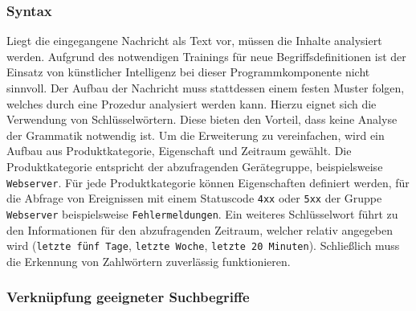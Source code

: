 \subsubsection{Syntax}
\label{sec:syntax}

Liegt die eingegangene Nachricht als Text vor, müssen die Inhalte analysiert werden. Aufgrund des notwendigen Trainings für neue Begriffsdefinitionen ist der Einsatz von künstlicher Intelligenz bei dieser Programmkomponente nicht sinnvoll. Der Aufbau der Nachricht muss stattdessen einem festen Muster folgen, welches durch eine Prozedur analysiert werden kann. Hierzu eignet sich die Verwendung von Schlüsselwörtern. Diese bieten den Vorteil, dass keine Analyse der Grammatik notwendig ist. Um die Erweiterung zu vereinfachen, wird ein Aufbau aus Produktkategorie, Eigenschaft und Zeitraum gewählt. Die Produktkategorie entspricht der abzufragenden Gerätegruppe, beispielsweise \lstinline{Webserver}. Für jede Produktkategorie können Eigenschaften definiert werden, für die Abfrage von Ereignissen mit einem Statuscode \lstinline{4xx} oder \lstinline{5xx} der Gruppe \lstinline{Webserver} beispielsweise \lstinline{Fehlermeldungen}. Ein weiteres Schlüsselwort führt zu den Informationen für den abzufragenden Zeitraum, welcher relativ angegeben wird (\lstinline{letzte fünf Tage}, \lstinline{letzte Woche}, \lstinline{letzte 20 Minuten}). Schließlich muss die Erkennung von Zahlwörtern zuverlässig funktionieren.

\subsubsection{Verknüpfung geeigneter Suchbegriffe}

